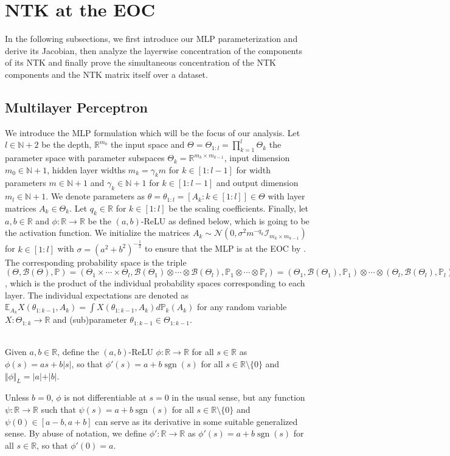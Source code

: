 \documentclass[twoside,11pt]{article}
\newcommand{\R}{\mathbb{R}}
\newcommand{\N}{\mathbb{N}}
\newcommand{\E}{\mathbb{E}}
\newcommand{\Prob}{\mathbb{P}}
\newcommand{\Id}{\mathcal{I}}
\DeclareMathOperator{\sgn}{sgn}
\begin{document}
\section{NTK at the EOC}\label{ntk}

In the following subsections, we first introduce our MLP parameterization and derive its Jacobian, then analyze the layerwise concentration of the components of its NTK and finally prove the simultaneous concentration of the NTK components and the NTK matrix itself over a dataset.

\subsection{Multilayer Perceptron}\label{mlp}

We introduce the MLP formulation which will be the focus of our analysis. Let $l \in \N+2$ be the depth, $\R^{m_0}$ the input space and $\Theta = \Theta_{1:l} = \prod_{k=1}^l \Theta_k$ the parameter space with parameter subspaces $\Theta_k = \R^{m_k \times m_{k-1}}$, input dimension $m_0 \in \N+1$, hidden layer widths $m_k = \gamma_k m$ for $k \in [1:l-1]$ for width parameters $m \in \N+1$ and $\gamma_k \in \N+1$ for $k \in [1:l-1]$ and output dimension $m_l \in \N+1$. We denote parameters as $\theta = \theta_{1:l} = [A_k : k \in [1:l]] \in \Theta$ with layer matrices $A_k \in \Theta_k$. Let $q_k \in \R$ for $k \in [1:l]$ be the scaling coefficients. Finally, let $a,b \in \R$ and $\phi : \R \to \R$ be the $(a,b)$-ReLU as defined below, which is going to be the activation function. We initialize the matrices $A_k \sim \mathcal{N}( 0,\sigma^2 m^{-q_k} \Id_{m_k \times m_{k-1}} )$ for $k \in [1:l]$ with $\sigma = (a^2 + b^2)^{-\frac{1}{2}}$ to ensure that the MLP is at the EOC by \citet[Lemma~3]{Hayouetal2019}. The corresponding probability space is the triple $(\Theta, \mathcal{B}(\Theta), \Prob) = (\Theta_1 \times \cdots \times \Theta_l, \mathcal{B}(\Theta_1) \otimes \cdots \otimes \mathcal{B}(\Theta_l), \Prob_1 \otimes \cdots \otimes \Prob_l) = (\Theta_1, \mathcal{B}(\Theta_1), \Prob_1) \otimes \cdots \otimes (\Theta_l, \mathcal{B}(\Theta_l),\Prob_l)$, which is the product of the individual probability spaces corresponding to each layer. The individual expectations are denoted as $\E_{A_k} X(\theta_{1:k-1},A_k) = \int X(\theta_{1:k-1},A_k) d\Prob_k(A_k)$ for any random variable $X : \Theta_{1:k} \to \R$ and (sub)parameter $\theta_{1:k-1} \in \Theta_{1:k-1}$.

\begin{definition}[$(a,b)$-ReLU]~\\
Given $a,b \in \R$, define the $(a,b)$-ReLU $\phi : \R \to \R$ for all $s \in \R$ as $\phi(s) = as + b\vert s \vert$, so that $\phi'(s) = a + b \sgn(s)$ for all $s \in \R \setminus \{ 0 \}$ and $\Vert \phi \Vert_L = \vert a \vert + \vert b \vert$.
\end{definition}
Unless $b=0$, $\phi$ is not differentiable at $s=0$ in the usual sense, but any function $\psi : \R \to \R$ such that $\psi(s) = a + b \sgn(s)$ for all $s \in \R \setminus \{ 0 \}$ and $\psi(0) \in [a-b,a+b]$ can serve as its derivative in some suitable generalized sense. By abuse of notation, we define $\phi': \R \to \R$ as $\phi'(s) = a + b \sgn(s)$ for all $s \in \R$, so that $\phi'(0) = a$.
\end{document}
